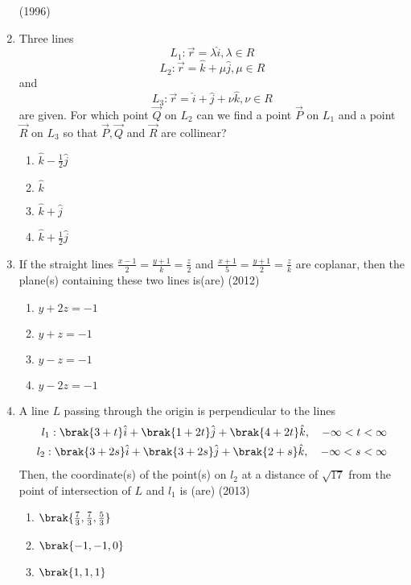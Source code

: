 \begin{enumerate}
\hfill{(1996)}
\item %
	Three lines $$L_1:\vec{r}=\lambda\hat{i}, \lambda\in R$$ 
		$$L_2:\vec{r}=\hat{k}+\mu\hat{j}, \mu\in R$$ and
		$$L_3:\vec{r}=\hat{i}+\hat{j}+\nu\hat{k}, \nu\in R$$
		are given. For which point $\vec{Q}$ on $L_2$ can we find a point $\vec{P}$ on $L_1$ and a point $\vec{R}$ on $L_3$ so that $\vec{P},\vec{Q}$ and $\vec{R}$ are collinear? \hfill{}
\begin{multicols}{4}
  \begin{enumerate}
	  \item $\hat{k}-\frac{1}{2}\hat{j}$
	  \item $\hat{k}$
	  \item $\hat{k}+\hat{j}$
	  \item $\hat{k}+\frac{1}{2}\hat{j}$
   \end{enumerate}
\end{multicols}
	\item If the straight lines $\frac{x-1}{2}=\frac{y+1}{k}=\frac{z}{2}$ and $\frac{x+1}{5}=\frac{y+1}{2}=\frac{z}{k}$ are coplanar, then the plane(s) containing these two lines is(are) \hfill{(2012)}
\begin{multicols}{4}
		\begin{enumerate}
			\item $y+2z=-1$
			\item $y+z=-1$
			\item $y-z=-1$
			\item $y-2z=-1$
		\end{enumerate}
\end{multicols}
	\item A line $L$ passing through the origin is perpendicular to the lines
		\begin{align*}
			l_1 : \brak{3+t}\hat{i}+\brak{1+2t}\hat{j}+\brak{4+2t}\hat{k},\quad -\infty<t<\infty \\
			l_2 : \brak{3+2s}\hat{i}+\brak{3+2s}\hat{j}+\brak{2+s}\hat{k}, \quad -\infty<s<\infty 
		\end{align*}
		Then, the coordinate(s) of the point(s) on $l_2$ at a distance of $\sqrt{17}$ from the point of intersection of $L$ and $l_1$ is (are) \hfill{(2013)}
\begin{multicols}{4}
		\begin{enumerate}
			\item $\brak{\frac{7}{3},\frac{7}{3},\frac{5}{3}}$
			\item $\brak{-1,-1,0}$
			\item $\brak{1,1,1}$

\end{enumerate}
\end{multicols}
\end{enumerate}
